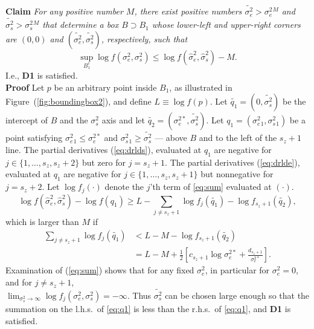\documentclass{report}
\newcommand{\RL}{f}
\newcommand{\logRL}{\log\RL}
\newcommand{\sigssq}{\sigma_s^2}
\newcommand{\sigesq}{\sigma_e^2}
\newcommand{\sshat}{\hat\sigma^2_e,\hat\sigma^2_s}
\newcommand{\logRLss}{\logRL(\sigesq,\sigssq)}
\begin{document}
\noindent\textbf{Claim} \emph{For any positive number $M$, there exist positive numbers $\widetilde{\sigma_e^2} > \sigesq{}^M$ and $\widetilde{\sigma_s^2} > \sigssq{}^M$ that determine a box $B \supset B_1$ whose lower-left and upper-right corners are $(0,0)$ and $(\widetilde{\sigma_e^2}, \widetilde{\sigma_s^2})$, respectively, such that
\begin{equation*}
  \sup_{B_1^c} \logRLss \le \logRL(\sshat) - M.
\end{equation*}}
I.e., \textbf{D1} is satisfied.\\
\noindent\textbf{Proof}
Let $p$ be an arbitrary point inside $B_1$, as illustrated in Figure~(\ref{fig:boundingbox2}), and define $L \equiv \logRL(p)$.  Let $\widetilde{q_1} = (0,\widetilde{\sigma_s^2})$ be the intercept of $B$ and the $\sigssq$ axis and let $\widetilde{q_2} = (\sigma_e^{2*},\widetilde{\sigma_s^2})$.  Let $q_1 = (\sigesq{}_1, \sigssq{}_1)$ be a point satisfying $\sigesq{}_1 \le \sigma_e^{2*}$ and $\sigssq{}_1 \ge \widetilde{\sigma_s^2}$ --- above $B$ and to the left of the $s_z+1$ line.  The partial derivatives (\ref{eq:drlds}), evaluated at $q_1$ are negative for $j \in \{1, \dots, s_z, s_z+2\}$ but zero for $j=s_z+1$.  The partial derivatives (\ref{eq:drlde}), evaluated at $q_1$ are negative for $j \in \{1, \dots, s_z, s_z+1\}$ but nonnegative for $j=s_z+2$.  Let $\logRL_j(\cdot)$ denote the $j$'th term of \eqref{eq:sum} evaluated at $(\cdot)$.  
\begin{equation}
	\logRL(\sshat) - \logRL(q_1) \ge L - \sum_{j \ne s_z+1} \logRL_j(\widetilde{q_1}) - \logRL_{s_z+1}(\widetilde{q_2}),
\end{equation}
which is larger than $M$ if
\begin{equation}
\label{eq:q1}
  \begin{split}
    \sum_{j \ne s_z+1} \logRL_j(\widetilde{q_1})
      &< L - M - \logRL_{s_z+1}(\widetilde{q_2})\\
      &= L - M + \frac{1}{2} \left[ c_{s_z+1}\log\sigma_e^{2*} + \frac{d_{s_z+1}}{\sigma_e^{2*}}\right].
  \end{split}
\end{equation}
Examination of (\ref{eq:sum}) shows that for any fixed $\sigesq$, in particular for $\sigesq=0$, and for $j \ne s_z+1$,\\ $\lim_{\sigssq \rightarrow \infty} \logRL_j(\sigesq,\sigssq) = -\infty$.  Thus $\widetilde{\sigma_s^2}$ can be chosen large enough so that the summation on the l.h.s.~of \eqref{eq:q1} is less than the r.h.s.~of \eqref{eq:q1}, and  \textbf{D1} is satisfied.
\end{document}

